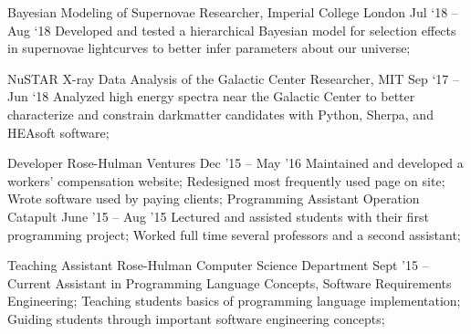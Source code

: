 \documentclass{resume}
\begin{document}
\begin{resumeheader}
\end{resumeheader}

\begin{resumebody}


        \experience
            {Bayesian Modeling of Supernovae}
            {Researcher, Imperial College London}
            {Jul `18 -- Aug `18}
            {
                Developed and tested a hierarchical Bayesian model for selection effects in
                supernovae lightcurves to better infer parameters about our universe;
            }

        \experience
            {NuSTAR X-ray Data Analysis of the Galactic Center}
            {Researcher, MIT}
            {Sep `17 -- Jun `18}
            {
                Analyzed high energy spectra near the Galactic Center to better characterize and
                constrain darkmatter candidates with Python, Sherpa, and HEAsoft software;
            }

        \experience
            {Developer}
            {Rose-Hulman Ventures}
            {Dec '15 -- May '16}
            {
                Maintained and developed a workers' compensation website;
                Redesigned most frequently used page on site;
                Wrote software used by paying clients;
            }
        \experience
            {Programming Assistant}
            {Operation Catapult}
            {June '15 -- Aug '15}
            {
                Lectured and assisted students with their first programming project;
                Worked full time several professors and a second assistant;
            }

        \experience
            {Teaching Assistant}
            {Rose-Hulman Computer Science Department}
            {Sept '15 -- Current}
            {
                Assistant in Programming Language Concepts, Software Requirements Engineering;
                Teaching students basics of programming language implementation;
                Guiding students through important software engineering concepts;
            }


\end{resumebody}
\end{document}
